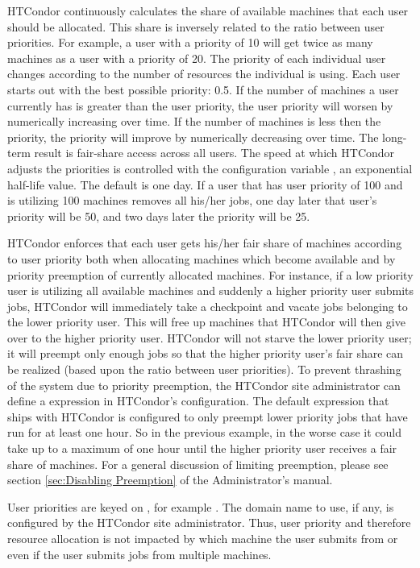 HTCondor continuously calculates the share of available machines that each
user should be allocated.    This share is inversely related to the ratio
between user priorities.
For example, a user with a priority of 10 will get twice as many
machines as a user with a priority of 20.
The priority of each individual user changes according to
the number of resources the individual is using.
Each user starts out with the best possible priority: 0.5.
If the number of machines a user currently has is greater than 
the user priority,
the user priority will worsen by numerically increasing over time.
If the number of machines is less then the priority,
the priority will improve by numerically decreasing over time. 
The long-term result is fair-share access across all users.
The speed at which HTCondor adjusts the priorities is
controlled with the configuration variable ,
an exponential half-life value.
The default is one day.
If a user that has user priority of 100 and is
utilizing 100 machines removes all his/her jobs,
one day later that user's
priority will be 50, and two days later the priority will be 25.

HTCondor enforces that each user gets his/her fair share of machines
according to user priority both when allocating machines which become
available and by priority preemption of currently allocated machines.
For instance, if a low priority user is utilizing all available machines
and suddenly a higher priority user submits jobs, HTCondor will
immediately take a checkpoint and vacate jobs belonging to the lower priority
user. This will free up machines that HTCondor will then give over to the
higher priority user. HTCondor will not starve the lower priority user; it
will preempt only enough jobs so that the higher priority user's fair
share can be realized (based upon the ratio between user priorities). To
prevent thrashing of the system due to priority preemption, the HTCondor 
site administrator can define a  expression in HTCondor's configuration.
The default expression that ships with HTCondor is configured to only preempt 
lower priority jobs that have run
for at least one hour. So in the previous example, in the worse case it
could take up to a maximum of one hour until the higher priority user
receives a fair share of machines.
For a general discussion of
limiting preemption,
please see
section \ref{sec:Disabling Preemption} of the Administrator's manual.

User priorities are keyed on , for example
. The domain name to use, if any, is configured by
the HTCondor site administrator.  Thus, user priority and therefore resource
allocation is not impacted by which machine the user submits from or
even if the user submits jobs from multiple machines.

